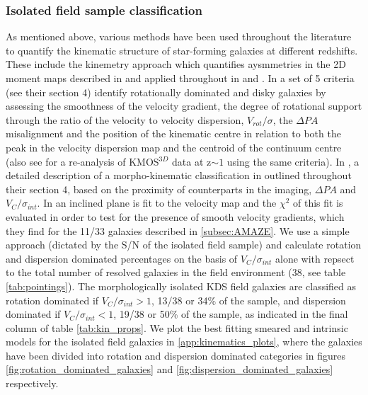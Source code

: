 \documentclass[fleqn,usenatbib]{mn2e}
\begin{document}
\subsubsection{Isolated field sample classification}\label{subsubsection:isolated_classification}
As mentioned above, various methods have been used throughout the literature to quantify the kinematic structure of star-forming galaxies at different redshifts. 
These include the kinemetry approach which quantifies aysmmetries in the 2D moment maps described in \cite{Shapiro2008} and applied throughout in \cite{ForsterSchreiber2009} and \cite{Cresci2009}.
In \cite{Wisnioski2015} a set of 5 criteria (see their section 4) identify rotationally dominated and disky galaxies by assessing the smoothness of the velocity gradient, the degree of rotational support through the ratio of the velocity to velocity dispersion, $V_{rot}/\sigma$, the $\Delta PA$ misalignment and the position of the kinematic centre in relation to both the peak in the velocity dispersion map and the centroid of the continuum centre (also see \cite{Rodrigues2016} for a re-analysis of KMOS$^{3D}$ data at z$\sim 1$ using the same criteria).   
In \cite{Epinat2012}, a detailed description of a morpho-kinematic classification in outlined throughout their section 4, based on the proximity of counterparts in the imaging, $\Delta PA$ and $V_{C}/\sigma_{int}$.
In \cite{Gnerucci2011} an inclined plane is fit to the velocity map and the $\chi^{2}$ of this fit is evaluated in order to test for the presence of smooth velocity gradients, which they find for the 11/33 galaxies described in \cref{subsec:AMAZE}.
We use a simple approach (dictated by the S/N of the isolated field sample) and calculate rotation and dispersion dominated percentages on the basis of $V_{C}/\sigma_{int}$ alone with repsect to the total number of resolved galaxies in the field environment (38, see table \ref{tab:pointings}).
The morphologically isolated KDS field galaxies are classified as rotation dominated if $V_{C}/\sigma_{int} > 1$, 13/38 or 34\% of the sample, and dispersion dominated if $V_{C}/\sigma_{int} < 1$, 19/38 or 50\% of the sample, as indicated in the final column of table \ref{tab:kin_props}.
We plot the best fitting smeared and intrinsic models for the isolated field galaxies in \cref{app:kinematics_plots}, where the galaxies have been divided into rotation and dispersion dominated categories in figures \ref{fig:rotation_dominated_galaxies} and \ref{fig:dispersion_dominated_galaxies} respectively.
\end{document}
